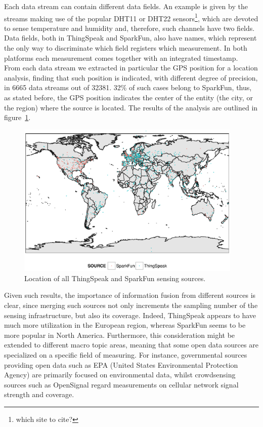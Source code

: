 Each data stream can contain different data fields.
An example is given by the streams making use of the popular DHT11 or DHT22 sensors\footnote{which site to cite?}, which are devoted to sense temperature and humidity and, therefore, such channels have two fields.
Data fields, both in ThingSpeak and SparkFun, also have names, which represent the only way to discriminate which field registers which measurement.
In both platforms each measurement comes together with an integrated timestamp.
\\

From each data stream we extracted in particular the GPS position for a location analysis, finding that such position is indicated, with different degree of precision, in 6665 data streams out of 32381.
32\% of such cases belong to SparkFun, thus, as stated before, the GPS position indicates the center of the entity (the city, or the region) where the source is located.
The results of the analysis are outlined in figure~\ref{geo}.

\begin{figure}[t]
\centering
\includegraphics[width=0.96\textwidth]{img/map.eps} 
\caption{Location of all ThingSpeak and SparkFun sensing sources.}
\label{geo}
\end{figure}

Given such results, the importance of information fusion from different sources is clear, since merging such sources not only increments the sampling number of the sensing infrastructure, but also its coverage.
Indeed, ThingSpeak appears to have much more utilization in the European region, whereas SparkFun seems to be more popular in North America.
Furthermore, this consideration might be extended to different macro topic areas, meaning that some open data sources are specialized on a specific field of measuring.
For instance, governmental sources providing open data such as EPA (United States Environmental Protection Agency) \cite{epa} are primarily focused on environmental data, whilst crowdsensing sources such as OpenSignal \cite{opensignal} regard measurements on cellular network signal strength and coverage.


